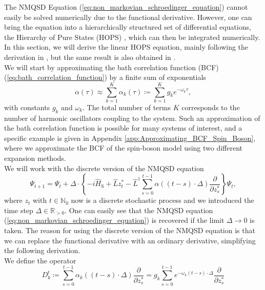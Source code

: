 The NMQSD Equation (\ref{eq:non_markovian_schroedinger_equation})
cannot easily be solved numerically due to the functional derivative.
However, one can bring the equation into a hierarchically structured
set of differential equations, the Hierarchy of Pure States (HOPS) \cite{Suess:2014},
which can then be integrated numerically. In this section, we will derive the linear HOPS equation, mainly
following the derivation in \cite{Hartmann:2021}, but the same result is also obtained in \cite{Suess:2014,Hartmann:2017}.
\\
We will start by approximating the bath correlation function (BCF) (\ref{eq:bath_correlation_function}) by a finite sum of exponentials
\begin{equation*}
    \alpha\left(\tau\right) \approx \sum_{k=1}^{K} \alpha_k\left(\tau\right) \coloneqq \sum_{k=1}^{K} g_k e^{-\omega_k\tau},
\end{equation*}
with constants $g_k$ and $\omega_k$. The total number of terms $K$ corresponds
to the number of harmonic oscillators coupling to the system. Such an approximation
of the bath correlation function is possible for many systems of interest, and a specific
example is given in Appendix \ref{app:Approximating_BCF_Spin_Boson}, where we approximate the BCF of the spin-boson model
using two different expansion methods.
\\
We will work with the discrete version of the NMQSD equation \cite{Hartmann:2021}
\begin{equation}
    \label{eq:discrete_NMQSD_equation}
    \Psi_{t+1} = \Psi_t + \Delta \cdot \left\{
        -i\hat{H}_\text{S} + \hat{L}z_{t}^* - \hat{L}^\dagger \sum_{s=0}^{t-1} \alpha\left((t-s)\cdot\Delta\right)\frac{\partial}{\partial z_{s}^*}
    \right\} \Psi_t,
\end{equation}
where $z_t$ with $t \in \mathbb{N}_0$ now is a discrete stochastic process and we introduced the time step $\Delta \in \mathbb{R}_{>0}$. One can easily see that the NMQSD equation (\ref{eq:non_markovian_schroedinger_equation}) 
is recovered if the limit $\Delta\rightarrow0$ is taken. The reason for using the discrete version of the NMQSD equation
is that we can replace the functional derivative with an ordinary derivative, simplifying the following derivation.
\\
We define the operator
\begin{equation*}
    D_k^t \coloneqq \sum_{s=0}^{t-1} \alpha_k\left((t-s)\cdot\Delta\right) \frac{\partial}{\partial z_s^*}
    = g_k \sum_{s=0}^{t-1} e^{-\omega_k\left(t-s\right)\cdot\Delta}
    \frac{\partial}{\partial z_s^*}
\end{equation*}

